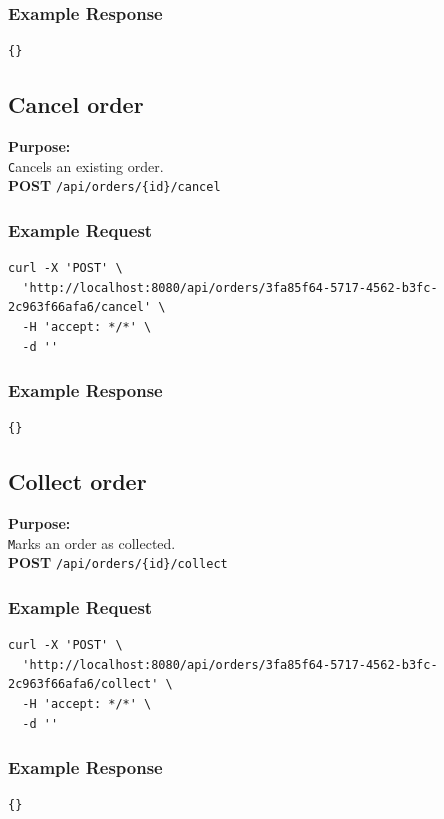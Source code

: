 \documentclass[a4paper,11pt]{article}
\begin{document}
\subsubsection*{Example Response}
\begin{lstlisting}
{}
\end{lstlisting}

\subsection{Cancel order}
\textbf{Purpose:} \\ \texttt Cancels an existing order. \\

\textbf{POST} \texttt{/api/orders/\{id\}/cancel}

\subsubsection*{Example Request}
\begin{lstlisting}
curl -X 'POST' \
  'http://localhost:8080/api/orders/3fa85f64-5717-4562-b3fc-2c963f66afa6/cancel' \
  -H 'accept: */*' \
  -d ''
\end{lstlisting}

\subsubsection*{Example Response}
\begin{lstlisting}
{}
\end{lstlisting}

\subsection{Collect order}
\textbf{Purpose:} \\ \texttt Marks an order as collected. \\

\textbf{POST} \texttt{/api/orders/\{id\}/collect}

\subsubsection*{Example Request}
\begin{lstlisting}
curl -X 'POST' \
  'http://localhost:8080/api/orders/3fa85f64-5717-4562-b3fc-2c963f66afa6/collect' \
  -H 'accept: */*' \
  -d ''
\end{lstlisting}

\subsubsection*{Example Response}
\begin{lstlisting}
{}
\end{lstlisting}
\end{document}
